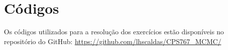 \documentclass[12 pt]{article}
\begin{document}
\section*{Códigos}

Os códigos utilizados para a resolução dos exercícios estão disponíveis no repositório do GitHub: \url{https://github.com/lhscaldas/CPS767_MCMC/}

\end{document}
